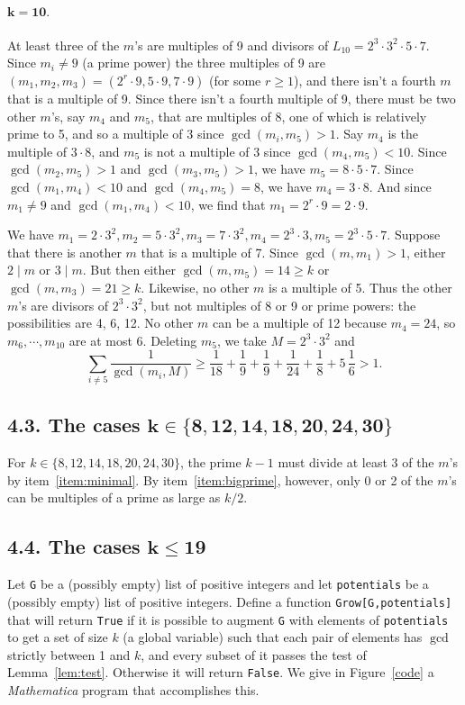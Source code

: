 \documentclass[12pt]{article}
\begin{document}
\paragraph{$\mathbf{k=10}.$}
At least three of the $m$'s are multiples of 9 and divisors of $L_{10}=2^3\cdot 3^2\cdot5\cdot7$. Since
$m_i\not=9$ (a prime power) the three multiples of 9 are $(m_1,m_2,m_3)=(2^r\cdot 9, 5\cdot 9, 7\cdot 9)$ (for
some $r\ge1$), and there isn't a fourth $m$ that is a multiple of 9. Since there isn't a fourth multiple of 9,
there must be two other $m$'s, say $m_4$ and $m_5$, that are multiples of 8, one of which is relatively prime to
5, and so a multiple of 3 since $\gcd(m_i,m_5)>1$. Say $m_4$ is the multiple of $3\cdot8$, and $m_5$ is not a
multiple of 3 since $\gcd(m_4,m_5)<10$. Since $\gcd(m_2,m_5)>1$ and $\gcd(m_3,m_5)>1$, we have $m_5=8\cdot 5
\cdot 7$. Since $\gcd(m_1,m_4)<10$ and $\gcd(m_4,m_5)=8$, we have $m_4=3\cdot8$. And since $m_1\not=9$ and
$\gcd(m_1,m_4)<10$, we find that $m_1=2^r \cdot 9 = 2\cdot 9$.

We have $m_1=2\cdot 3^2, m_2=5\cdot 3^2, m_3=7\cdot 3^2, m_4=2^3\cdot 3, m_5=2^3\cdot5\cdot7$. Suppose that
there is another $m$ that is a multiple of 7. Since $\gcd(m,m_1)>1$, either $2 \mid m$ or $3 \mid m$. But then
either $\gcd(m,m_5)=14\ge k$ or $\gcd(m,m_3)=21 \ge k$. Likewise, no other $m$ is a multiple of 5. Thus the
other $m$'s are divisors of $2^3\cdot 3^2$, but not multiples of 8 or 9 or prime powers: the possibilities are
4, 6, 12. No other $m$ can be a multiple of 12 because $m_4=24$, so $m_6,\cdots, m_{10}$ are at most 6. Deleting
$m_5$, we take $M=2^3\cdot3^2$ and
    \[\sum_{i\not=5} \frac{1}{\gcd(m_i,M)} \geq \frac 1{18}+\frac 19 + \frac 19 + \frac 1{24}+\frac 18+5\,\frac
    16 >1.\]

\subsection*{\normalsize 4.3. The cases $\mathbf{k\in\{8,12,14,18,20,24,30\}}$}
For $k\in\{8,12,14,18,20,24,30\}$, the prime $k-1$ must divide at least 3 of the $m$'s by
item~\ref{item:minimal}. By item~\ref{item:bigprime}, however, only 0 or 2 of the $m$'s can be multiples of a
prime as large as $k/2$.

\subsection*{\normalsize 4.4. The cases $\mathbf{k \le 19}$}

Let {\tt G} be a (possibly empty) list of positive integers and let {\tt potentials} be a (possibly empty) list
of positive integers. Define a function {\tt Grow[G,potentials]} that will return {\tt True} if it is possible
to augment {\tt G} with elements of {\tt potentials} to get a set of size $k$ (a global variable) such that each
pair of elements has $\gcd$ strictly between 1 and $k$, and every subset of it passes the test of
Lemma~\ref{lem:test}. Otherwise it will return {\tt False}. We give in Figure~\ref{code} a {\em Mathematica}
program that accomplishes this.
\end{document}
